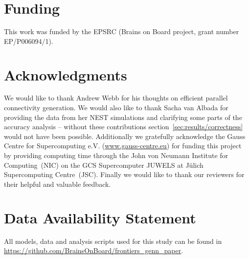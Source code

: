 \documentclass[utf8]{frontiersSCNS} %
\begin{document}
\section*{Funding}
This work was funded by the EPSRC (Brains on Board project, grant number EP/P006094/1).

\section*{Acknowledgments}
We would like to thank Andrew Webb for his thoughts on efficient parallel connectivity generation.
We would also like to thank Sacha van Albada for providing the data from her NEST simulations and clarifying some parts of the accuracy analysis -- without these contributions section~\ref{sec:results/correctness} would not have been possible.
Additionally we gratefully acknowledge the Gauss Centre for Supercomputing e.V. (\url{www.gauss-centre.eu}) for funding this project by providing computing time through the John von Neumann Institute for Computing~(NIC) on the GCS Supercomputer JUWELS at J{\"u}lich Supercomputing Centre~(JSC).
Finally we would like to thank our reviewers for their helpful and valuable feedback.

\section*{Data Availability Statement}
All models, data and analysis scripts used for this study can be found in \url{https://github.com/BrainsOnBoard/frontiers_genn_paper}.
%



\end{document}
